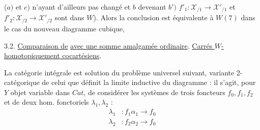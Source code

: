 ($a)$ et $c)$ n'ayant d'ailleurs pas changé et $b$ devenant $b')$ $f'_1:\mathscr X_{/1}\to\mathscr X'_{/1}$ et $f'_2:\mathscr X_{/2}\to\mathscr X'_{/2}$ sont dans $W$). Alors la conclusion  est équivalente à $W(7)$  dans le cas du nouveau diagramme cubique, 

3.2. \uline{Comparaison de}
\uline{avec une somme amalgamée ordinaire}. \uline{Carrés $W$-homotopiquement cocartésiens}.

La catégorie intégrale
est solution du problème universel suivant,  variante 2-catégorique de celui que définit la limite inductive du diagramme : il s'agit, pour $Y$ objet variable dans $\mathit{Cat}$, de considérer les systèmes de trois foncteurs $f_0,f_1,f_2$ et de deux hom. fonctoriels $\lambda_1,\lambda_2$ :
\[
\begin{aligned}
\lambda_1 &: f_1\alpha_1\to f_0\\
\lambda_2 &: f_2\alpha_2\to f_0
\end{aligned}
\]
